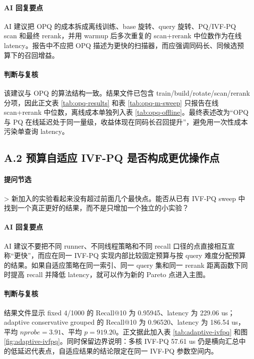 \documentclass[a4paper,11pt,UTF8]{ctexart}
\begin{document}
\paragraph{AI 回复要点}

AI 建议把 OPQ 的成本拆成离线训练、base 旋转、query 旋转、PQ/IVF-PQ scan 和最终 rerank，并用 warmup 后多次重复的 scan+rerank 中位数作为在线 latency。报告中不应把 OPQ 描述为更快的扫描器，而应强调同码长、同候选预算下的召回增益。

\paragraph{判断与复核}

该建议与 OPQ 的算法结构一致。结果文件已包含 train/build/rotate/scan/rerank 分项，因此正文表 \ref{tab:opq-results} 和表 \ref{tab:opq-m-sweep} 只报告在线 scan+rerank 中位数，离线成本单独列入表 \ref{tab:opq-offline}。最终表述改为“OPQ 与 PQ 在线延迟处于同一量级，收益体现在同码长召回提升”，避免用一次性成本污染单查询 latency。

\subsection*{A.2 预算自适应 IVF-PQ 是否构成更优操作点}

\paragraph{提问节选}

> 新加入的实验看起来没有超过前面几个最快点。能否从已有 IVF-PQ sweep 中找到一个真正更好的结果，而不是只增加一个独立的小实验？

\paragraph{AI 回复要点}

AI 建议不要把不同 runner、不同线程策略和不同 recall 口径的点直接相互宣称“更快”，而应在同一 IVF-PQ 实现内部比较固定预算与按 query 难度分配预算的结果。如果自适应策略在同一索引、同一 query 集和同一 rerank 距离函数下同时提高 recall 并降低 latency，就可以作为新的 Pareto 点进入主图。

\paragraph{判断与复核}

结果文件显示 fixed 4/1000 的 Recall@10 为 0.95945、latency 为 229.06 us；adaptive conservative grouped 的 Recall@10 为 0.96520、latency 为 186.54 us，平均 $nprobe=3.91$、平均 $p=919.20$。正文据此加入表 \ref{tab:adaptive-ivfpq} 和图 \ref{fig:adaptive-ivfpq}。同时保留边界说明：多核 IVF-PQ 57.61 us 仍是横向汇总中的低延迟代表点，自适应结果的结论限定在同一 IVF-PQ 参数空间内。
\end{document}
